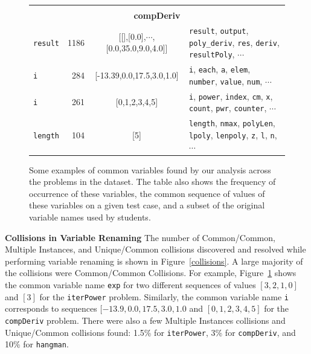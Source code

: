 \documentclass[12pt,twoside]{mitthesis}
\newcommand \codevar[1]{\texttt{#1}}
\begin{document}
\begin{figure}
\begin{tabular} {|l|r|c|l|}
\multicolumn{4}{|c|}{}\\
\multicolumn{4}{|c|}{\bf compDeriv}\\ \hline
\codevar{result} & 1186 & [[],[0.0],$\cdots$,[0.0,35.0,9.0,4.0]] & \codevar{result}, \codevar{output}, \codevar{poly\_deriv}, \codevar{res}, \codevar{deriv}, \codevar{resultPoly}, $\cdots$\\ \hline
\codevar{i} & 284 &  [-13.39,0.0,17.5,3.0,1.0] & \codevar{i}, \codevar{each}, \codevar{a}, \codevar{elem}, \codevar{number}, \codevar{value}, \codevar{num}, $\cdots$\\ \hline
\codevar{i} & 261 & [0,1,2,3,4,5] & \codevar{i}, \codevar{power}, \codevar{index}, \codevar{cm}, \codevar{x}, \codevar{count}, \codevar{pwr}, \codevar{counter}, $\cdots$\\ \hline
\codevar{length} & 104 & [5] & \codevar{length}, \codevar{nmax}, \codevar{polyLen}, \codevar{lpoly}, \codevar{lenpoly}, \codevar{z}, \codevar{l}, \codevar{n}, $\cdots$\\ \hline

\end{tabular}
\caption{Some examples of common variables found by our analysis across the problems in the dataset. The table also shows the frequency of occurrence of these variables, the common sequence of values of these variables on a given test case, and a subset of the original variable names used by students.}
\label{examplecommonvars}
\end{figure}

{\bf Collisions in Variable Renaming} The number of Common/Common, Multiple Instances, and Unique/Common collisions discovered and resolved while performing variable renaming is shown in Figure~\ref{collisions}. A large majority of the collisions were Common/Common Collisions. For example, Figure~\ref{examplecommonvars} shows the common variable name \codevar{exp} for two different sequences of values $[3,2,1,0]$ and $[3]$ for the \codevar{iterPower} problem. Similarly, the common variable name \codevar{i} corresponds to sequences $[-13.9, 0.0, 17.5, 3.0, 1.0$ and $[0, 1, 2, 3, 4, 5]$ for the \codevar{compDeriv} problem. There were also a few Multiple Instances collisions and Unique/Common collisions found: 1.5\% for \codevar{iterPower}, 3\% for \codevar{compDeriv}, and 10\% for \codevar{hangman}.
\end{document}
